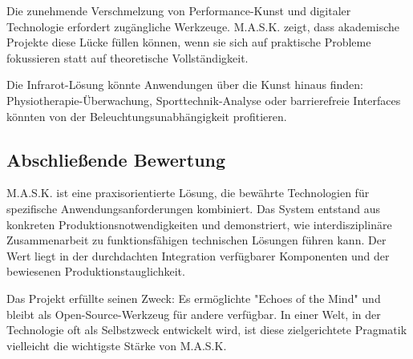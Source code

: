 Die zunehmende Verschmelzung von Performance-Kunst und digitaler Technologie erfordert zugängliche Werkzeuge. M.A.S.K. zeigt, dass akademische Projekte diese Lücke füllen können, wenn sie sich auf praktische Probleme fokussieren statt auf theoretische Vollständigkeit.

Die Infrarot-Lösung könnte Anwendungen über die Kunst hinaus finden: Physiotherapie-Überwachung, Sporttechnik-Analyse oder barrierefreie Interfaces könnten von der Beleuchtungsunabhängigkeit profitieren.

\subsection{Abschließende Bewertung}

M.A.S.K. ist eine praxisorientierte Lösung, die bewährte Technologien für spezifische Anwendungsanforderungen kombiniert. Das System entstand aus konkreten Produktionsnotwendigkeiten und demonstriert, wie interdisziplinäre Zusammenarbeit zu funktionsfähigen technischen Lösungen führen kann. Der Wert liegt in der durchdachten Integration verfügbarer Komponenten und der bewiesenen Produktionstauglichkeit.

Das Projekt erfüllte seinen Zweck: Es ermöglichte "Echoes of the Mind" und bleibt als Open-Source-Werkzeug für andere verfügbar. In einer Welt, in der Technologie oft als Selbstzweck entwickelt wird, ist diese zielgerichtete Pragmatik vielleicht die wichtigste Stärke von M.A.S.K.